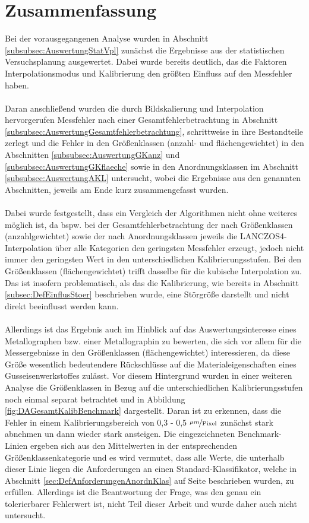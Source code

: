 \documentclass[
fontsize=10pt, 
listof = totoc,
parskip = half	
]{report}
\begin{document}
\section{Zusammenfassung}
\label{sec:Zusammenfassung}
Bei der vorausgegangenen Analyse wurden in Abschnitt \ref{subsubsec:AuswertungStatVpl} zunächst die Ergebnisse aus der statistischen Versuchsplanung ausgewertet. Dabei wurde bereits deutlich, das die Faktoren Interpolationsmodus und Kalibrierung den größten Einfluss auf den Messfehler haben.
\\\\
\noindent Daran anschließend wurden  die durch Bildskalierung und Interpolation hervorgerufen Messfehler nach einer Gesamtfehlerbetrachtung in Abschnitt \ref{subsubsec:AuswertungGesamtfehlerbetrachtung}, schrittweise in ihre Bestandteile zerlegt und die Fehler in den Größenklassen (anzahl- und flächengewichtet) in den Abschnitten \ref{subsubsec:AuswertungGKanz} und \ref{subsubsec:AuswertungGKflaeche} sowie in den Anordnungsklassen im Abschnitt \ref{subsubsec:AuswertungAKL} untersucht, wobei die Ergebnisse aus den genannten Abschnitten, jeweils am Ende kurz zusammengefasst wurden.
\\\\
\noindent Dabei wurde festgestellt, dass ein Vergleich der Algorithmen nicht ohne weiteres möglich ist, da bspw. bei der Gesamtfehlerbetrachtung der nach Größenklassen (anzahlgewichtet) sowie der nach Anordnungsklassen jeweils die LANCZOS4- Interpolation über alle Kategorien den geringsten Messfehler erzeugt, jedoch nicht immer den geringsten Wert in den unterschiedlichen Kalibrierungsstufen. Bei den Größenklassen (flächengewichtet) trifft dasselbe für die kubische Interpolation zu. Das ist insofern problematisch, als das die Kalibrierung, wie bereits in Abschnitt \ref{subsec:DefEinflusStoer} beschrieben wurde, eine Störgröße darstellt und nicht direkt beeinflusst werden kann.
\\\\
Allerdings ist das Ergebnis auch im Hinblick auf das Auswertungsinteresse eines Metallographen bzw. einer Metallographin zu bewerten, die sich vor allem für die Messergebnisse in den Größenklassen (flächengewichtet) interessieren, da diese Größe wesentlich bedeutendere Rückschlüsse auf die Materialeigenschaften eines Gusseisenwerkstoffes zulässt. Vor diesem Hintergrund wurden in einer weiteren Analyse die Größenklassen in Bezug auf die unterschiedlichen Kalibrierungsstufen noch einmal separat betrachtet und in Abbildung \ref{fig:DAGesamtKalibBenchmark} dargestellt. Daran ist zu erkennen, dass die Fehler in einem Kalibrierungsbereich von 0,3 - 0,5 $\nicefrac{\mu m}{\text{Pixel}}$ zunächst stark abnehmen un dann wieder stark ansteigen. Die eingezeichneten Benchmark-Linien ergeben sich aus den Mittelwerten in der entsprechenden Größenklassenkategorie und es wird vermutet, dass alle Werte, die unterhalb dieser Linie liegen die Anforderungen an einen Standard-Klassifikator, welche in Abschnitt \ref{sec:DefAnforderungenAnordnKlas} auf Seite \pageref{sec:DefAnforderungenAnordnKlas} beschrieben wurden, zu erfüllen. Allerdings ist die Beantwortung der Frage, was den genau ein tolerierbarer Fehlerwert ist, nicht Teil dieser Arbeit und wurde daher auch nicht untersucht.
\end{document}

